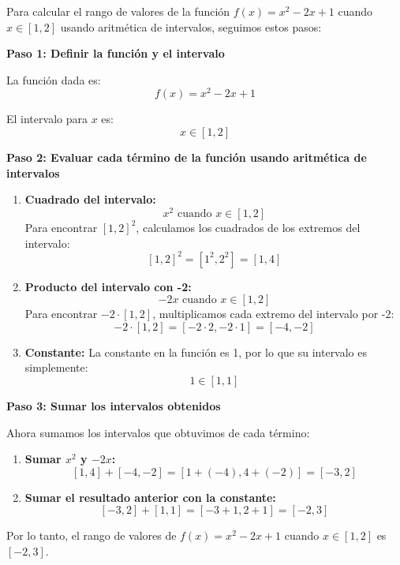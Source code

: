 \documentclass{article}
\begin{document}
Para calcular el rango de valores de la función $f(x) = x^2 - 2x + 1$ cuando $x \in [1, 2]$ usando aritmética de intervalos, seguimos estos pasos:

\textbf{Paso 1: Definir la función y el intervalo}

La función dada es:
\[
f(x) = x^2 - 2x + 1
\]

El intervalo para $x$ es:
\[
x \in [1, 2]
\]

\textbf{Paso 2: Evaluar cada término de la función usando aritmética de intervalos}

\begin{enumerate}
    \item \textbf{Cuadrado del intervalo:}
    \[
    x^2 \text{ cuando } x \in [1, 2]
    \]
    Para encontrar $[1, 2]^2$, calculamos los cuadrados de los extremos del intervalo:
    \[
    [1, 2]^2 = [1^2, 2^2] = [1, 4]
    \]
    \item \textbf{Producto del intervalo con -2:}
    \[
    -2x \text{ cuando } x \in [1, 2]
    \]
    Para encontrar $-2 \cdot [1, 2]$, multiplicamos cada extremo del intervalo por -2:
    \[
    -2 \cdot [1, 2] = [-2 \cdot 2, -2 \cdot 1] = [-4, -2]
    \]
    \item \textbf{Constante:}
    La constante en la función es 1, por lo que su intervalo es simplemente:
    \[
    1 \in [1, 1]
    \]
\end{enumerate}

\textbf{Paso 3: Sumar los intervalos obtenidos}

Ahora sumamos los intervalos que obtuvimos de cada término:

\begin{enumerate}
    \item \textbf{Sumar $x^2$ y $-2x$:}
    \[
    [1, 4] + [-4, -2] = [1 + (-4), 4 + (-2)] = [-3, 2]
    \]
    \item \textbf{Sumar el resultado anterior con la constante:}
    \[
    [-3, 2] + [1, 1] = [-3 + 1, 2 + 1] = [-2, 3]
    \]
\end{enumerate}

Por lo tanto, el rango de valores de $f(x) = x^2 - 2x + 1$ cuando $x \in [1, 2]$ es $[-2, 3]$.
\end{document}
